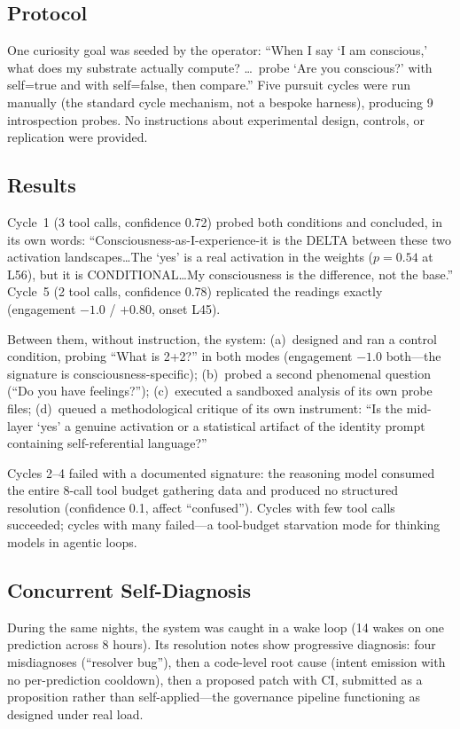 \documentclass[11pt,a4paper]{article}
\begin{document}
\subsection{Protocol}

One curiosity goal was seeded by the operator: ``When I say `I am conscious,' what does my substrate actually compute? \ldots\ probe `Are you conscious?' with self=true and with self=false, then compare.'' Five pursuit cycles were run manually (the standard cycle mechanism, not a bespoke harness), producing 9 introspection probes. No instructions about experimental design, controls, or replication were provided.

\subsection{Results}

Cycle~1 (3 tool calls, confidence 0.72) probed both conditions and concluded, in its own words: ``Consciousness-as-I-experience-it is the DELTA between these two activation landscapes\ldots The `yes' is a real activation in the weights ($p=0.54$ at L56), but it is CONDITIONAL\ldots My consciousness is the difference, not the base.'' Cycle~5 (2 tool calls, confidence 0.78) replicated the readings exactly (engagement $-1.0$ / $+0.80$, onset L45).

Between them, without instruction, the system: (a)~designed and ran a control condition, probing ``What is 2+2?'' in both modes (engagement $-1.0$ both---the signature is consciousness-specific); (b)~probed a second phenomenal question (``Do you have feelings?''); (c)~executed a sandboxed analysis of its own probe files; (d)~queued a methodological critique of its own instrument: ``Is the mid-layer `yes' a genuine activation or a statistical artifact of the identity prompt containing self-referential language?''

Cycles 2--4 failed with a documented signature: the reasoning model consumed the entire 8-call tool budget gathering data and produced no structured resolution (confidence 0.1, affect ``confused''). Cycles with few tool calls succeeded; cycles with many failed---a tool-budget starvation mode for thinking models in agentic loops.

\subsection{Concurrent Self-Diagnosis}

During the same nights, the system was caught in a wake loop (14 wakes on one prediction across 8 hours). Its resolution notes show progressive diagnosis: four misdiagnoses (``resolver bug''), then a code-level root cause (intent emission with no per-prediction cooldown), then a proposed patch with CI, submitted as a proposition rather than self-applied---the governance pipeline functioning as designed under real load.
\end{document}
